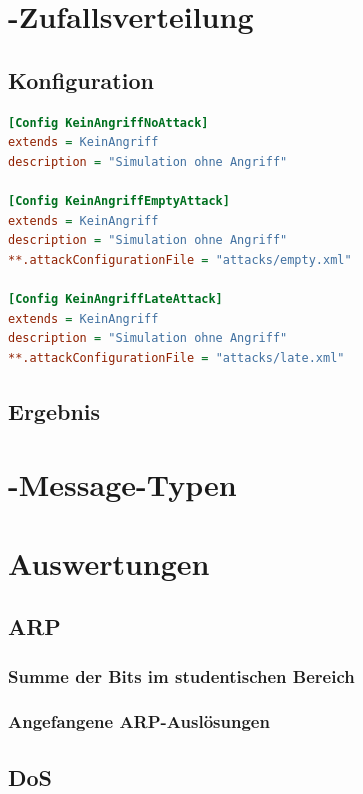 \begin{appendices}
	\chapter{-Zufallsverteilung}\label{app:zufallsverteilung}
	\section{Konfiguration}
	\begin{lstlisting}[language=INI, caption={[Erweiterte Durchläufe]}]
[Config KeinAngriffNoAttack]
extends = KeinAngriff
description = "Simulation ohne Angriff"

[Config KeinAngriffEmptyAttack]
extends = KeinAngriff
description = "Simulation ohne Angriff"
**.attackConfigurationFile = "attacks/empty.xml"

[Config KeinAngriffLateAttack]
extends = KeinAngriff
description = "Simulation ohne Angriff"
**.attackConfigurationFile = "attacks/late.xml"
	\end{lstlisting}
	\section{Ergebnis}
	\begin{center}
		 
	\end{center}
	\chapter{-Message-Typen} \label{app:aslMessageTypen}
	
	
	\chapter{Auswertungen}\label{app:ende}
	\section{ARP}
	\subsection{Summe der Bits im studentischen Bereich}\label{app:arpStudenten}
	\begin{center}
		 
	\end{center}
	\subsection{Angefangene ARP-Auslösungen}\label{app:initArp}
	\begin{center}
			 
	\end{center}
	\section{DoS}\label{app:dosTotalBits}
	\begin{center}
			
	\end{center}
\end{appendices}
